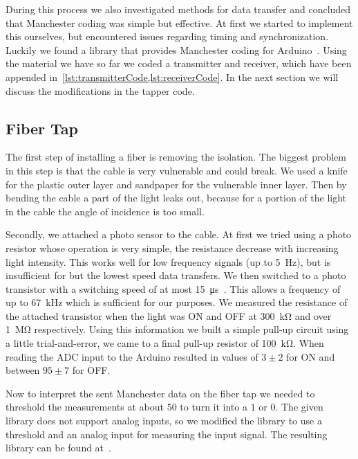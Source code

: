 \documentclass[11pt,twoside,a4paper]{scrartcl}
\begin{document}
		During this process we also investigated methods for data transfer and concluded that Manchester coding was simple but effective.
		At first we started to implement this ourselves, but encountered issues regarding timing and synchronization.
		Luckily we found a library that provides Manchester coding for Arduino~\cite{manchestercoding}.
		Using the material we have so far we coded a transmitter and receiver, which have been appended in~\cref{lst:transmitterCode,lst:receiverCode}.
		In the next section we will discuss the modifications in the tapper code.

	\subsection{Fiber Tap}
		The first step of installing a fiber is removing the isolation.
		The biggest problem in this step is that the cable is very vulnerable and could break.
		We used a knife for the plastic outer layer and sandpaper for the vulnerable inner layer.
		Then by bending the cable a part of the light leaks out,
		because for a portion of the light in the cable the angle of incidence is too small.

		Secondly, we attached a photo sensor to the cable.
		At first we tried using a photo resistor whose operation is very simple,
		the resistance decrease with increasing light intensity.
		This works well for low frequency signals (up to \SI{5}{\hertz}),
		but is insufficient for but the lowest speed data transfers.
		We then switched to a photo transistor with a switching speed of at most \SI{15}{\micro\second}~\cite{phototransistor}.
		This allows a frequency of up to \SI{67}{\kilo\hertz} which is sufficient for our purposes.
		We measured the resistance of the attached transistor when the light was ON and OFF
		at \SI{300}{\kilo\ohm} and over \SI{1}{\mega\ohm} respectively.
		Using this information we built a simple pull-up circuit using a little trial-and-error,
		we came to a final pull-up resistor of \SI{100}{\kilo\ohm}.
		When reading the ADC input to the Arduino resulted in values of $3 \pm 2$ for ON and between $95 \pm 7$ for OFF.

		Now to interpret the sent Manchester data on the fiber tap we needed to threshold the measurements
		at about $50$ to turn it into a $1$ or $0$.
		The given library does not support analog inputs, so we modified the library to use
		a threshold and an analog input for measuring the input signal.
		The resulting library can be found at~\cite{analogmanchestercoding}.
\end{document}
